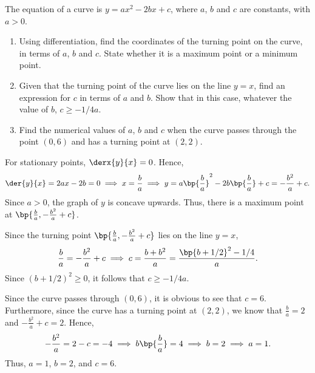 \begin{problem}
    The equation of a curve is $y = ax^2 - 2bx + c$, where $a$, $b$ and $c$ are constants, with $a > 0$.

    \begin{enumerate}
        \item Using differentiation, find the coordinates of the turning point on the curve, in terms of $a$, $b$ and $c$. State whether it is a maximum point or a minimum point.
        \item Given that the turning point of the curve lies on the line $y=x$, find an expression for $c$ in terms of $a$ and $b$. Show that in this case, whatever the value of $b$, $c \geq -1/4a$.
        \item Find the numerical values of $a$, $b$ and $c$ when the curve passes through the point $(0, 6)$ and has a turning point at $(2, 2)$.
    \end{enumerate}
\end{problem}
\begin{solution}
    \begin{ppart}
        For stationary points, $\derx{y}{x} = 0$. Hence, \[\der{y}{x} = 2ax - 2b = 0 \implies x = \frac{b}{a} \implies y = a\bp{\frac{b}{a}}^2 - 2b\bp{\frac{b}{a}} + c = -\frac{b^2}{a} + c.\] Since $a > 0$, the graph of $y$ is concave upwards. Thus, there is a maximum point at $\bp{\frac{b}{a}, -\frac{b^2}a + c}$.
    \end{ppart}
    \begin{ppart}
        Since the turning point $\bp{\frac{b}{a}, -\frac{b^2}a + c}$  lies on the line $y=x$, \[\frac{b}{a} = -\frac{b^2}a + c \implies c = \frac{b + b^2}a = \frac{\bp{b + 1/2}^2 - 1/4}{a}.\] Since $(b + 1/2)^2 \geq 0$, it follows that $c \geq -1/4a$.
    \end{ppart}
    \begin{ppart}
        Since the curve passes through $(0, 6)$, it is obvious to see that $c = 6$. Furthermore, since the curve has a turning point at $(2, 2)$, we know that $\frac{b}{a} = 2$ and $-\frac{b^2}a + c = 2$. Hence, \[-\frac{b^2}{a} = 2 - c = -4 \implies b\bp{\frac{b}{a}} = 4 \implies b = 2 \implies a = 1.\] Thus, $a = 1$, $b = 2$, and $c = 6$.
    \end{ppart}
\end{solution}

